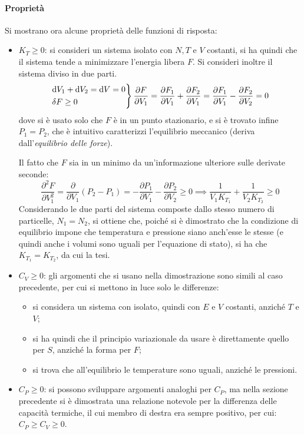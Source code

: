 \paragraph{Proprietà} Si mostrano ora alcune proprietà delle funzioni di risposta:
\begin{itemize}
	\item $K_T \geq 0$: si consideri un sistema isolato con $N,T$ e $V$ costanti, si ha quindi che il sistema tende a minimizzare l'energia libera $F$. Si consideri inoltre il sistema diviso in due parti.
	\begin{align*}
	\begin{rcases*}
	\dd V_1 + \dd V_2 = \dd V = 0\\
	\delta F \geq 0
	\end{rcases*}
		 \frac{\partial F}{\partial V_1} = \frac{\partial F_1}{\partial V_1} + \frac{\partial F_2}{\partial V_1} = \frac{\partial F_1}{\partial V_1} - \frac{\partial F_2}{\partial V_2} = 0
	\end{align*}
	dove si è usato solo che $F$ è in un punto stazionario, e si è trovato infine $P_1 = P_2$, che è intuitivo caratterizzi l'equilibrio meccanico (deriva dall'\textit{equilibrio delle forze}).
	
	Il fatto che $F$ sia in un minimo da un'informazione ulteriore sulle derivate seconde:
	\begin{equation*}
	 \frac{\partial^2 F}{\partial V_1^2} =  \frac{\partial}{\partial V_1} (P_2 - P_1) =  -\frac{\partial P_1}{\partial V_1} -\frac{\partial P_2}{\partial V_2} \geq 0 \implies \frac{1}{V_1 K_{T_1}} + \frac{1}{V_2 K_{T_2}} \geq 0
	\end{equation*}
	Considerando le due parti del sistema composte dallo stesso numero di particelle, $N_1 = N_2$, si ottiene che, poiché si è dimostrato che la condizione di equilibrio impone che temperatura e pressione siano anch'esse le stesse (e quindi anche i volumi sono uguali per l'equazione di stato), si ha che $K_{T_1} = K_{T_2}$, da cui la tesi.
	\item $C_V \geq 0$: gli argomenti che si usano nella dimostrazione sono simili al caso precedente, per cui si mettono in luce solo le differenze:
	\begin{itemize}
		\item si considera un sistema con isolato, quindi con $E$ e $V$ costanti, anziché $T$ e $V$;
		\item si ha quindi che il principio variazionale da usare è direttamente quello per $S$, anziché la forma per $F$;
		\item si trova che all'equilibrio le temperature sono uguali, anziché le pressioni.
	\end{itemize}
	\item $C_P \geq 0$: si possono sviluppare argomenti analoghi per $C_P$, ma nella sezione precedente si è dimostrata una relazione notevole per la differenza delle capacità termiche, il cui membro di destra era sempre positivo, per cui: $C_P \geq C_V \geq 0$.
\end{itemize}

